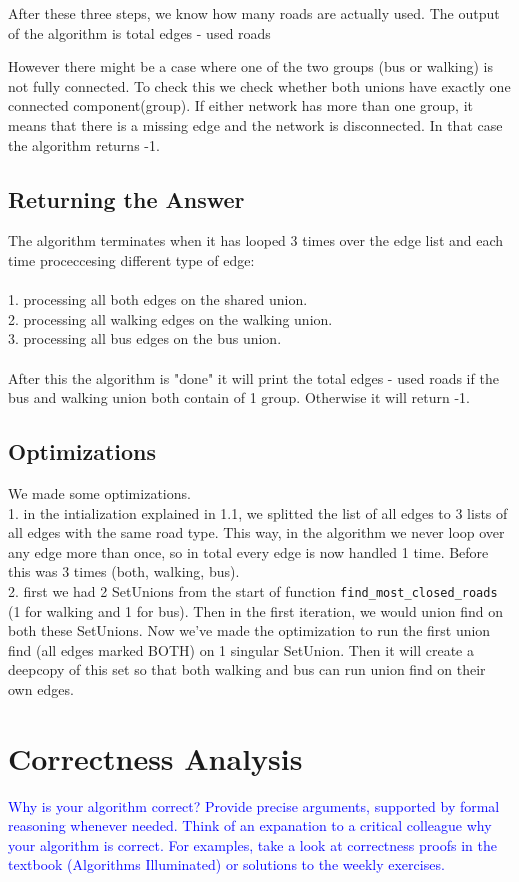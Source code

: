 \documentclass[a4paper]{article}
\newcommand{\instruction}[1]{\textcolor{blue}{#1}}
\begin{document}
After these three steps, we know how many roads are actually used.
The output of the algorithm is total edges - used roads

However there might be a case where one of the two groups (bus or walking) is not fully connected.
To check this we check whether both unions have exactly one connected component(group).
If either network has more than one group, it means that there is a missing edge and the network is disconnected.
In that case the algorithm returns -1.


\subsection{Returning the Answer}
The algorithm terminates when it has looped 3 times over the edge list and each time proceccesing different type of edge:
\\
\\
1. processing all both edges on the shared union.
\\
2. processing all walking edges on the walking union.
\\
3. processing all bus edges on the bus union.
\\
\\
After this the algorithm is "done" it will print the total edges - used roads if the bus and walking union both contain of 1 group. Otherwise it will return -1. 
\subsection{Optimizations}
We made some optimizations.\\1. in the intialization explained in 1.1, we splitted the list of all edges to 3 lists of all edges with the same road type. This way, in the algorithm we never loop over any edge more than once, so in total every edge is now handled 1 time. Before this was 3 times (both, walking, bus).
\\2. first we had 2 SetUnions from the start of function \texttt{find\_most\_closed\_roads} (1 for walking and 1 for bus). Then in the first iteration, we would union find on both these SetUnions. Now we've made the optimization to run the first union find (all edges marked BOTH) on 1 singular SetUnion. Then it will create a deepcopy of this set so that both walking and bus can run union find on their own edges.

\section{Correctness Analysis}
\instruction{Why is your algorithm correct? Provide precise arguments, supported by formal reasoning whenever needed. Think of an expanation to a critical colleague why your algorithm is correct. For examples, take a look at correctness proofs in the textbook (Algorithms Illuminated) or solutions to the weekly exercises.}
\end{document}
